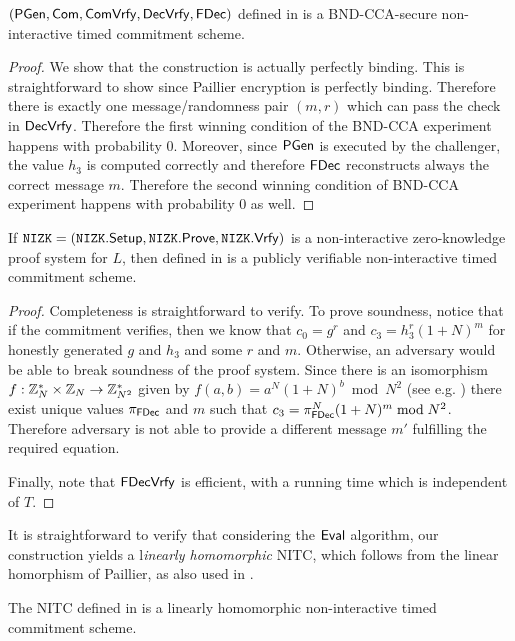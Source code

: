 \begin{theorem}\label{bnd-cca-lh}
$(\mathsf{PGen}, \mathsf{Com}, \mathsf{ComVrfy}, \mathsf{DecVrfy}, \mathsf{FDec})$ defined in  is a BND-CCA-secure non-interactive timed commitment scheme. 
\end{theorem}

\begin{proof}
We show that the construction is actually perfectly binding. This is straightforward to show since Paillier encryption is perfectly binding. Therefore there is exactly one message/randomness pair $(m,r)$ which can pass the check in $\mathsf{DecVrfy}$. Therefore the first winning condition of the BND-CCA experiment happens with probability 0. Moreover, since $\mathsf{PGen}$ is executed by the challenger, the value $h_3$ is computed correctly and therefore $\mathsf{FDec}$ reconstructs always the correct message $m$. Therefore the second winning condition of BND-CCA experiment happens with probability 0 as well.
\end{proof}

\begin{theorem}\label{pv-lh}
If $\mathtt{NIZK} = (\mathtt{NIZK}.\mathsf{Setup}, \mathtt{NIZK}.\mathsf{Prove}, \mathtt{NIZK}.\mathsf{Vrfy})$ is a non-interactive zero-knowledge proof system for $L$, then \mathlist{(\pgen, \com, \cvrfy, \dvrfy, \fdecom, \fdvrfy)} defined in  is a publicly verifiable non-interactive timed commitment scheme.
\end{theorem}

\begin{proof}
Completeness is straightforward to verify. 
To prove soundness, notice that if the commitment verifies, then we know that $c_0 = g^r$ and $c_3 = h_3^r(1+N)^m$ for honestly generated $g$ and $h_3$ and some $r$ and $m$. Otherwise, an adversary would be able to break soundness of the proof system. Since there is an isomorphism $f:\mathbb{Z}_N^* \times \mathbb{Z}_N \rightarrow\mathbb{Z}_{N^2}^*$ given by $f(a,b)=a^N(1+N)^b \bmod N^2$ (see e.g. \cite[Proposition 13.6]{books/crc/KatzLindell2014}) there exist unique values $\pi_{\mathsf{FDec}}$ and $m$ such that $c_3=\pi_{\mathsf{FDec}}^N(1+N)^m \bmod N^2$. Therefore adversary is not able to provide a different message $m'$ fulfilling the required equation.

Finally, note that $\mathsf{FDecVrfy}$ is efficient, with a running time which is independent of $T$.
\end{proof}

It is straightforward to verify that considering the $\mathsf{Eval}$ algorithm, our construction yields a l\emph{inearly homomorphic} NITC, which follows from the linear homorphism of Paillier, as also used in \cite{C:MalThy19}. 
\begin{theorem}\label{hom-lh}
The NITC \mathlist{(\pgen, \com, \cvrfy, \dvrfy, \fdecom, \fdvrfy, \eval)} defined in  is a linearly homomorphic non-interactive timed commitment scheme.
\end{theorem}




